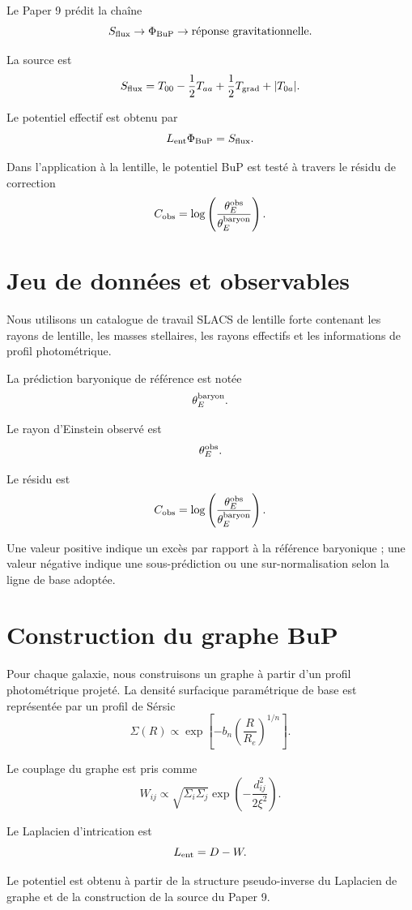 \documentclass[11pt,a4paper]{article}
\begin{document}
Le Paper 9 prédit la chaîne
\[
S_{\rm flux}
\rightarrow
\Phi_{\rm BuP}
\rightarrow
\text{réponse gravitationnelle}.
\]

La source est
\[
S_{\rm flux}
=
T_{00}
-\frac{1}{2}T_{aa}
+\frac{1}{2}T_{\rm grad}
+
|T_{0a}|.
\]

Le potentiel effectif est obtenu par
\[
L_{\rm ent}\Phi_{\rm BuP}=S_{\rm flux}.
\]

Dans l'application à la lentille, le potentiel BuP est testé à travers le résidu de correction
\[
C_{\rm obs}
=
\log\left(
\frac{\theta_E^{\rm obs}}
{\theta_E^{\rm baryon}}
\right).
\]

\section{Jeu de données et observables}

Nous utilisons un catalogue de travail SLACS de lentille forte contenant les rayons de lentille, les masses stellaires, les rayons effectifs et les informations de profil photométrique.

La prédiction baryonique de référence est notée
\[
\theta_E^{\rm baryon}.
\]

Le rayon d'Einstein observé est
\[
\theta_E^{\rm obs}.
\]

Le résidu est
\[
C_{\rm obs}
=
\log\left(
\frac{\theta_E^{\rm obs}}
{\theta_E^{\rm baryon}}
\right).
\]

Une valeur positive indique un excès par rapport à la référence baryonique ; une valeur négative indique une sous-prédiction ou une sur-normalisation selon la ligne de base adoptée.

\section{Construction du graphe BuP}

Pour chaque galaxie, nous construisons un graphe à partir d'un profil photométrique projeté. La densité surfacique paramétrique de base est représentée par un profil de Sérsic
\[
\Sigma(R)
\propto
\exp\left[
-b_n
\left(
\frac{R}{R_e}
\right)^{1/n}
\right].
\]

Le couplage du graphe est pris comme
\[
W_{ij}
\propto
\sqrt{\Sigma_i\Sigma_j}
\exp\left(
-\frac{d_{ij}^2}{2\xi^2}
\right).
\]

Le Laplacien d'intrication est
\[
L_{\rm ent}=D-W.
\]

Le potentiel est obtenu à partir de la structure pseudo-inverse du Laplacien de graphe et de la construction de la source du Paper 9.
\end{document}
